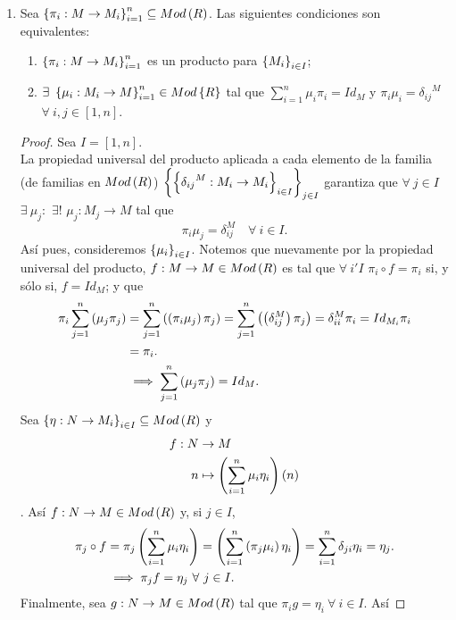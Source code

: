 \documentclass{article}
\begin{document}
\begin{enumerate}[label=\textbf{Ej \arabic*.}]
\begin{proof}
			
		\end{proof}
		\item Sea $\left\{\pi_i:M\to M_i\right\}_{i=1}^n\subseteq Mod\left(R\right)$. Las siguientes condiciones son equivalentes:
		\begin{enumerate}[label=\alph*)]
			\item $\left\{\pi_i:M\to M_i\right\}_{i=1}^n$ es un producto para ${\left\{{M}_{i}\right\}}_{i\in I}$;
			\item $\exists\ \left\{\mu_i:M_i\to M\right\}_{i=1}^n\in Mod\left\{R\right\}$ tal que $\sum_{i=1}^n\mu_i\pi_i=Id_M$ y $\pi_i\mu_i={\delta_{ij}}^M$ $\forall\ i,j\in[1,n]$.
		\end{enumerate}
		\begin{proof}
			Sea $I=[1,n]$.\\
			\boxed{\implies} La propiedad universal del producto aplicada a cada elemento de la familia (de familias en $Mod\left(R\right)$) $\left\{\left\{{\delta_{ij}}^M:M_i\to M_i\right\}_{i\in I}\right\}_{j\in I}$ garantiza que $\forall\ j\in I$ $\exists\ \mu_j:$ $\exists !$ $\mu_j:M_j\to M$ tal que \begin{equation*}
				\pi_i\mu_j=\delta_{ij}^M\quad \forall\ i\in I.
			\end{equation*}
			Así pues, consideremos ${\left\{{\mu}_{i}\right\}}_{i\in I}$. Notemos que nuevamente por la propiedad universal del producto, $f:M\to M\in Mod\left(R\right)$ es tal que $\forall\ i' I$ $\pi_i\circ f=\pi_i$ si, y sólo si, $f=Id_M$; y que
			\begin{align*}
				\pi_i\sum_{j=1}^n\left(\mu_j\pi_j\right)&=\sum_{j=1}^n\left(\left(\pi_i\mu_j\right)\pi_j\right)=\sum_{j=1}^n\left(\left(\delta_{ij}^M\right)\pi_j\right)=\delta_{ii}^M\pi_i=Id_{M_i}\pi_i\\
				&=\pi_i.\\
				&\implies \sum_{j=1}^n\left(\mu_j\pi_j\right)=Id_M.
			\end{align*} 
			\boxed{\impliedby} Sea $\left\{\eta:N\to M_i\right\}_{i\in I}\subseteq Mod\left(R\right)$ y 
			\begin{align*}
				f: N &\rightarrow M\\ n &\mapsto \left(\sum_{i=1}^n\mu_i\eta_i\right)\left(n\right)
			\end{align*}. Así $f:N\to M\in Mod\left(R\right)$ y, si $j\in I$,
			\begin{align*}
				\pi_j\circ f&=\pi_j\left(\sum_{i=1}^n\mu_i\eta_i\right)=\left(\sum_{i=1}^n\left(\pi_j\mu_i\right)\eta_i\right)=\sum_{i=1}^n\delta_{ji}\eta_i=\eta_j.\\
				&\implies\pi_j f=\eta_j\ \forall\ j\in I.
			\end{align*}
			Finalmente, sea $g:N\to M\in Mod\left(R\right)$ tal que $\pi_i g=\eta_i\ \forall\ i\in I$. Así

\end{proof}
\end{enumerate}
\end{document}

